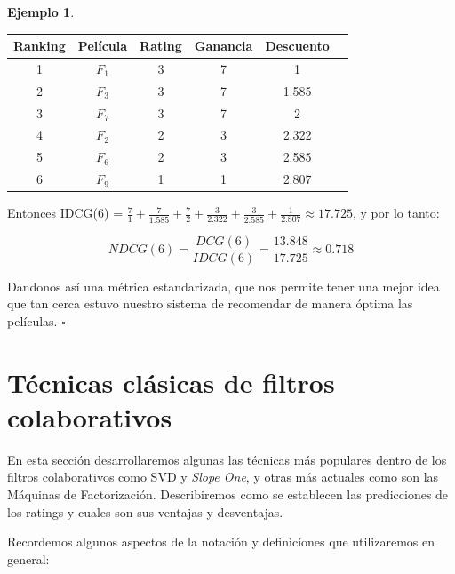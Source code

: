 \documentclass[hidelinks,12pt,a4paper]{book}
\theoremstyle{plain}
\theoremstyle{definition}
\newtheorem{ejemplo}{{\textbf{Ejemplo}}}[chapter]
\begin{document}
\begin{ejemplo}
\begin{center}
\begin{tabular}{|c|c|c|c|c|c|}
\hline
Ranking & Película & Rating & Ganancia & Descuento \\
\hline
1 & $F_1$ & 3 & 7 & 1  \\
\hline
2 & $F_3$ & 3 & 7 & 1.585  \\
\hline
3 & $F_7$ & 3 & 7 & 2 \\
\hline
4 & $F_2$ & 2 & 3 & 2.322  \\
\hline
5 & $F_6$ & 2 & 3 & 2.585  \\
\hline
6 & $F_9$ & 1 & 1 & 2.807  \\
\hline
\end{tabular}
\end{center}

Entonces IDCG(6) = $\frac{7}{1}+\frac{7}{1.585}+\frac{7}{2}+\frac{3}{2.322}+\frac{3}{2.585}+\frac{1}{2.807}\approx 17.725$, y por lo tanto:

\begin{equation}
NDCG(6)=\frac{DCG(6)}{IDCG(6)}=\frac{13.848}{17.725} \approx 0.718
\end{equation}

Dandonos así una métrica estandarizada, que nos permite tener una mejor idea que tan cerca estuvo nuestro sistema de recomendar de manera óptima las películas. \hfill$\square$
\end{ejemplo}




\section{Técnicas clásicas de filtros colaborativos}

En esta sección desarrollaremos algunas las técnicas más populares dentro de los filtros colaborativos como SVD y \textit{Slope One}, y otras más actuales como son las Máquinas de Factorización. Describiremos como se establecen las predicciones de los ratings y cuales son sus ventajas y desventajas.

Recordemos algunos aspectos de la notación y definiciones que utilizaremos en general:
\end{document}
